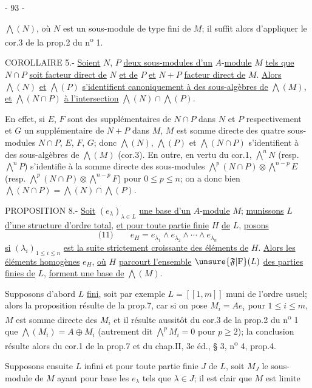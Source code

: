 \begin{center}- 93 -\end{center}

$\bigwedge(N)$, où $N$ est un sous-module de type fini de $M$; il suffit alors d'appliquer le cor.3 de la prop.2 du n\textsuperscript{o} 1.

COROLLAIRE 5.- \uline{Soient} $N$, $P$ \uline{deux sous-modules d'un} $A$-\uline{module} $M$ \uline{tels que} $N\cap P$ \uline{soit facteur direct de} $N$ \uline{et de} $P$ \uline{et} $N+P$ \uline{facteur direct de} $M$. \uline{Alors} $\bigwedge(N)$ \uline{et} $\bigwedge(P)$ \uline{s'identifient canoniquement à des sous-algèbres de} $\bigwedge(M)$, \uline{et} $\bigwedge(N\cap P)$ \uline{à l'intersection} $\bigwedge(N)\cap\bigwedge(P)$.

En effet, si $E$, $F$ sont des supplémentaires de $N\cap P$ dans $N$ et $P$ respectivement et $G$ un supplémentaire de $N+P$ dans $M$, $M$ est somme directe des quatre sous-modules $N\cap P$, $E$, $F$, $G$; donc $\bigwedge(N)$, $\bigwedge(P)$ et $\bigwedge(N\cap P)$ s'identifient à des sous-algèbres de $\bigwedge(M)$ (cor.3). En outre, en vertu du cor.1, $\mathop{\bigwedge}\limits^n N$ (resp. $\mathop{\bigwedge}\limits^n P$) s'identifie à la somme directe des sous-modules $\mathop{\bigwedge}\limits^p(N\cap P)\otimes\mathop{\bigwedge}\limits^{n-p}E$ (resp. $\mathop{\bigwedge}\limits^p(N\cap P)\otimes\mathop{\bigwedge}\limits^{n-p}F$) pour $0\leq p\leq n$; on a donc bien $\bigwedge(N\cap P)=\bigwedge(N)\cap\bigwedge(P)$.

PROPOSITION 8.- \uline{Soit} $(e_\lambda)_{\lambda\in L}$ \uline{une base d'un} $A$-\uline{module} $M$; \uline{munissons} $L$ \uline{d'une structure d'ordre total}, \uline{et pour toute partie finie} $H$ \uline{de} $L$, \uline{posons}
\[
\text{(11)}\qquad e_H=e_{\lambda_1}\wedge e_{\lambda_2}\wedge\cdots\wedge e_{\lambda_n}
\]
\uline{si} $(\lambda_i)_{1\leq i\leq n}$ \uline{est la suite strictement croissante des éléments de} $H$. \uline{Alors les éléments homogènes} $e_H$, \uline{où} $H$ \uline{parcourt l'ensemble} $\unsure{\mathfrak F|\mathrm F}(L)$ \uline{des parties finies de} $L$, \uline{forment une base de} $\bigwedge(M)$.

Supposons d'abord $L$ \uline{fini}, soit par exemple $L=[\![1,m]\!]$ muni de l'ordre usuel; alors la proposition résulte de la prop.7, car si on pose $M_i=Ae_i$ pour $1\leq i\leq m$, $M$ est somme directe des $M_i$ et il résulte aussitôt du cor.3 de la prop.2 du n\textsuperscript{o} 1 que $\bigwedge(M_i)=A\oplus M_i$ (autrement dit $\mathop{\bigwedge}\limits^p M_i=0$ pour $p\geq2$); la conclusion résulte alors du cor.1 de la prop.7 et du chap.II, 3e éd., § 3, n\textsuperscript{o} 4, prop.4.

Supposons ensuite $L$ infini et pour toute partie finie $J$ de $L$, soit $M_J$ le sous-module de $M$ ayant pour base les $e_\lambda$ tels que $\lambda\in J$; il est clair que $M$ est limite

